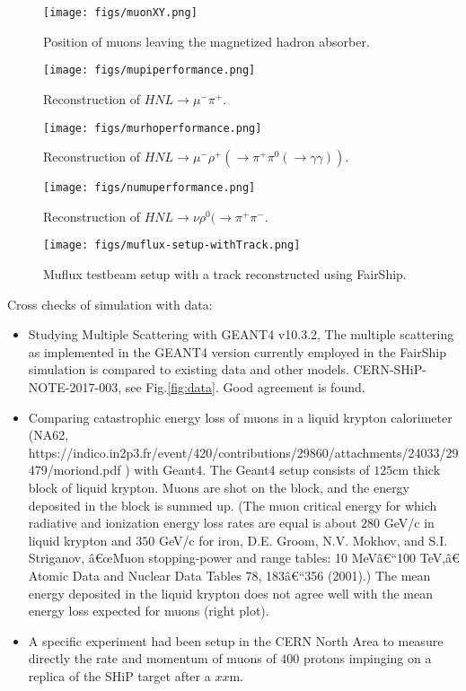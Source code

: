 \begin{figure}[h]
\centering
\texttt{[image: figs/muonXY.png]}
\caption{Position of muons leaving the magnetized hadron absorber.}
\label{fig:muonXY.png}
\end{figure}


\begin{figure}[h]
\centering
\texttt{[image: figs/mupiperformance.png]}
\caption{Reconstruction of $HNL\rightarrow \mu^-\pi^+$.}
\label{fig:signalpimu.png}
\end{figure}

\begin{figure}[h]
\centering
\texttt{[image: figs/murhoperformance.png]}
\caption{Reconstruction of $HNL\rightarrow \mu^- \rho^+(\rightarrow\pi^+\pi^0(\rightarrow\gamma\gamma))$.}
\label{fig:signalrhomu.png}
\end{figure}

\begin{figure}[h]
\centering
\texttt{[image: figs/numuperformance.png]}
\caption{Reconstruction of $HNL\rightarrow \nu\rho^0(\rightarrow\pi^+\pi^-$.}
\label{fig:signalnumurho0.png}
\end{figure}

\begin{figure}[h]
\centering
\texttt{[image: figs/muflux-setup-withTrack.png]}
\caption{Muflux testbeam setup with a track reconstructed using FairShip. }
\label{fig:eventDisplay.png}
\end{figure}


Cross checks of simulation with data:
\begin{itemize}
  \item Studying Multiple Scattering with GEANT4 v10.3.2, The multiple scattering as implemented in the GEANT4 version currently employed in the FairShip simulation is compared to existing data and other models.
CERN-SHiP-NOTE-2017-003, see Fig.\ref{fig:data}. Good agreement is found.
  \item Comparing catastrophic energy loss of muons in a liquid krypton calorimeter (NA62, https://indico.in2p3.fr/event/420/contributions/29860/attachments/24033/29479/moriond.pdf ) with Geant4.  The Geant4 setup consists of $125$cm thick block of liquid krypton.
  Muons are shot on the block, and the energy deposited in the block is summed up.  (The muon critical energy for which radiative and ionization energy loss rates are equal is about $280$ GeV/c in liquid krypton and $350$ GeV/c for iron, D.E. Groom, N.V. Mokhov, and S.I. Striganov, â€œMuon stopping-power and range tables: 10 MeVâ€“100 TeV,â€ Atomic Data and Nuclear Data Tables 78, 183â€“356 (2001).)  The mean energy deposited in the liquid krypton does not agree well with the mean energy loss expected for muons (right plot).
  \item A specific experiment had been setup in the CERN North Area to measure directly the rate and momentum of muons of $400$ protons impinging on a replica of the SHiP target after a $xx$m.
\end{itemize}


